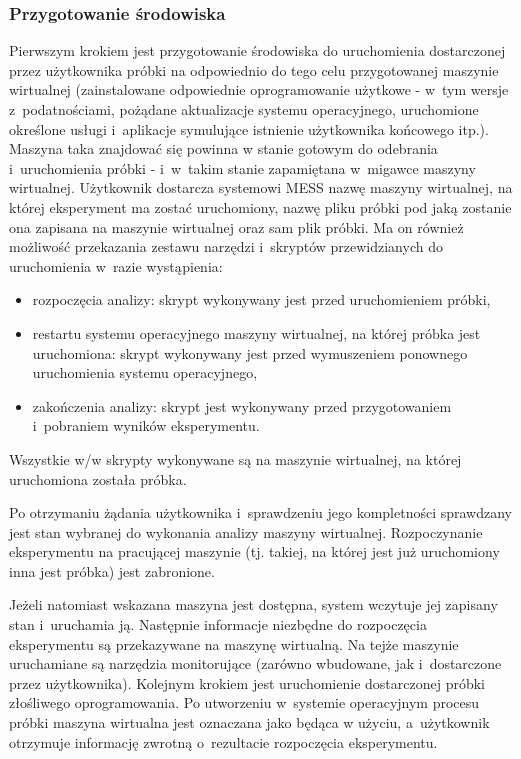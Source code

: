 \documentclass[a4paper,12pt,oneside]{article}
\begin{document}
	\subsubsection{Przygotowanie środowiska}
	
	Pierwszym krokiem jest przygotowanie środowiska do uruchomienia dostarczonej przez użytkownika próbki na odpowiednio do tego celu przygotowanej maszynie wirtualnej (zainstalowane odpowiednie oprogramowanie użytkowe - w~tym wersje z~podatnościami, pożądane aktualizacje systemu operacyjnego, uruchomione określone usługi i~aplikacje symulujące istnienie użytkownika końcowego itp.). Maszyna taka znajdować się powinna w stanie gotowym do odebrania i~uruchomienia próbki - i~w~takim stanie zapamiętana w~migawce maszyny wirtualnej. Użytkownik dostarcza systemowi MESS nazwę maszyny wirtualnej, na której eksperyment ma zostać uruchomiony, nazwę pliku próbki pod jaką zostanie ona zapisana na maszynie wirtualnej oraz sam plik próbki. Ma on również możliwość przekazania zestawu narzędzi i~skryptów przewidzianych do uruchomienia w~razie wystąpienia:
	\begin{itemize}
		\item rozpoczęcia analizy: skrypt wykonywany jest przed uruchomieniem próbki,
		\item restartu systemu operacyjnego maszyny wirtualnej, na której próbka jest uruchomiona: skrypt wykonywany jest przed wymuszeniem ponownego uruchomienia systemu operacyjnego,
		\item zakończenia analizy: skrypt jest wykonywany przed przygotowaniem i~pobraniem wyników eksperymentu.
	\end{itemize}
	Wszystkie w/w skrypty wykonywane są na maszynie wirtualnej, na której uruchomiona została próbka.
		
	Po otrzymaniu żądania użytkownika i~sprawdzeniu jego kompletności sprawdzany jest stan wybranej do wykonania analizy maszyny wirtualnej. Rozpoczynanie eksperymentu na pracującej maszynie (tj. takiej, na której jest już uruchomiony inna jest próbka) jest zabronione.
	
	Jeżeli natomiast wskazana maszyna jest dostępna, system wczytuje jej zapisany stan i~uruchamia ją. Następnie informacje niezbędne do rozpoczęcia eksperymentu są przekazywane na maszynę wirtualną. Na tejże maszynie uruchamiane są narzędzia monitorujące (zarówno wbudowane, jak i~dostarczone przez użytkownika). Kolejnym krokiem jest uruchomienie dostarczonej próbki złośliwego oprogramowania. Po utworzeniu w~systemie operacyjnym procesu próbki maszyna wirtualna jest oznaczana jako będąca w użyciu, a~użytkownik otrzymuje informację zwrotną o~rezultacie rozpoczęcia eksperymentu. 
	
\end{document}
